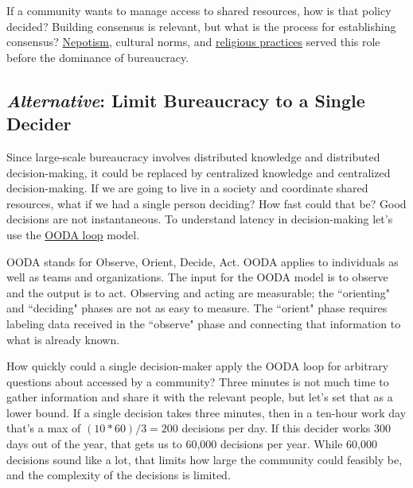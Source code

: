If a community wants to manage access to shared resources, how is that policy decided?  Building consensus is relevant, but what is the process for establishing consensus? 
\href{https://en.wikipedia.org/wiki/Nepotism}{Nepotism},
\iftoggle{WPinmargin}{\marginpar{$>$Wikipedia: Nepotism}}{}%
cultural norms, and 
\href{https://en.wikipedia.org/wiki/Religion}{religious practices}
served this role before the dominance of bureaucracy. 


\subsection*{\textit{Alternative}: Limit Bureaucracy to a Single Decider\label{sec:single-decider}}

Since large-scale bureaucracy involves distributed knowledge and distributed decision-making, it could be replaced by centralized knowledge and centralized decision-making. If we are going to live in a society and coordinate shared resources, what if we had a single person deciding? How fast could that be? Good decisions are not instantaneous. To understand latency in decision-making let's use the
\href{https://en.wikipedia.org/wiki/OODA_loop}{OODA loop} 
\iftoggle{WPinmargin}{\marginpar{$>$Wikipedia: OODA loop}}{}%
model. 

OODA stands for Observe, Orient, Decide, Act. OODA applies to individuals as well as teams and organizations. 
The input for the OODA model is to observe and the output is to act. Observing and acting are measurable; the ``orienting" and ``deciding" phases are not as easy to measure. The ``orient" phase requires labeling data received in the ``observe" phase and connecting that information to what is already known.

How quickly could a single decision-maker apply the OODA loop for arbitrary questions about \iftoggle{glossarysubstitutionworks}{\glspl{shared resource}}{shared resources} accessed by a community? Three minutes is not much time to gather information and share it with the relevant people, but let's set that as a lower bound.
If a single decision takes three minutes, then in a ten-hour work day that's a max of $(10*60)/3 = 200$ decisions per day. If this decider works 300 days out of the year, that gets us to 60,000 decisions per year. While 60,000 decisions sound like a lot, that limits how large the community could feasibly be, and the complexity of the decisions is limited. 

